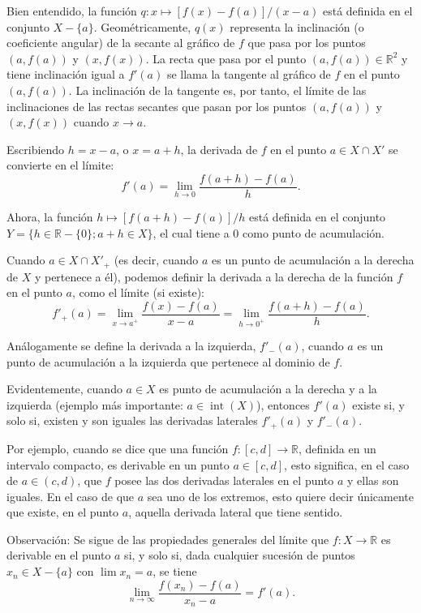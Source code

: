 \documentclass[12pt,oneside]{book}
\begin{document}
Bien entendido, la función \( q: x \mapsto [f(x) - f(a)]/(x - a) \) está definida en el conjunto \( X - \{a\} \). Geométricamente, \( q(x) \) representa la inclinación (o coeficiente angular) de la secante al gráfico de \( f \) que pasa por los puntos \( (a, f(a)) \) y \( (x, f(x)) \). La recta que pasa por el punto \( (a, f(a)) \in \mathbb{R}^2 \) y tiene inclinación igual a \( f'(a) \) se llama la tangente al gráfico de \( f \) en el punto \( (a, f(a)) \). La inclinación de la tangente es, por tanto, el límite de las inclinaciones de las rectas secantes que pasan por los puntos \( (a, f(a)) \) y \( (x, f(x)) \) cuando \( x \to a \).

Escribiendo \( h = x - a \), o \( x = a + h \), la derivada de \( f \) en el punto \( a \in X \cap X' \) se convierte en el límite:
\[
f'(a) = \lim_{h \to 0} \frac{f(a + h) - f(a)}{h}.
\]

Ahora, la función \( h \mapsto [f(a + h) - f(a)]/h \) está definida en el conjunto \( Y = \{h \in \mathbb{R} - \{0\}; a + h \in X\} \), el cual tiene a \( 0 \) como punto de acumulación.

Cuando \( a \in X \cap X'_+ \) (es decir, cuando \( a \) es un punto de acumulación a la derecha de \( X \) y pertenece a él), podemos definir la derivada a la derecha de la función \( f \) en el punto \( a \), como el límite (si existe):
\[
f'_+(a) = \lim_{x \to a^+} \frac{f(x) - f(a)}{x - a} = \lim_{h \to 0^+} \frac{f(a + h) - f(a)}{h}.
\]

Análogamente se define la derivada a la izquierda, \( f'_-(a) \), cuando \( a \) es un punto de acumulación a la izquierda que pertenece al dominio de \( f \).

Evidentemente, cuando \( a \in X \) es punto de acumulación a la derecha y a la izquierda (ejemplo más importante: \( a \in \operatorname{int}(X) \)), entonces \( f'(a) \) existe si, y solo si, existen y son iguales las derivadas laterales \( f'_+(a) \) y \( f'_-(a) \).

Por ejemplo, cuando se dice que una función \( f: [c, d] \to \mathbb{R} \), definida en un intervalo compacto, es derivable en un punto \( a \in [c, d] \), esto significa, en el caso de \( a \in (c, d) \), que \( f \) posee las dos derivadas laterales en el punto \( a \) y ellas son iguales. En el caso de que \( a \) sea uno de los extremos, esto quiere decir únicamente que existe, en el punto \( a \), aquella derivada lateral que tiene sentido.

Observación: Se sigue de las propiedades generales del límite que \( f: X \to \mathbb{R} \) es derivable en el punto \( a \) si, y solo si, dada cualquier sucesión de puntos \( x_n \in X - \{a\} \) con \( \lim x_n = a \), se tiene
\[
\lim_{n \to \infty} \frac{f(x_n) - f(a)}{x_n - a} = f'(a).
\]
\end{document}
